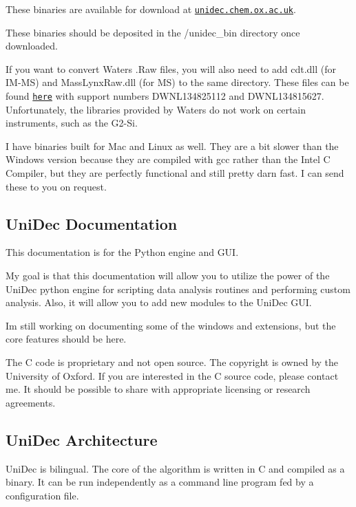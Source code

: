 These binaries are available for download at \href{http://unidec.chem.ox.ac.uk/}{\tt unidec.\+chem.\+ox.\+ac.\+uk}.

These binaries should be deposited in the /unidec\+\_\+bin directory once downloaded.

If you want to convert Waters .Raw files, you will also need to add cdt.\+dll (for I\+M-\/\+M\+S) and Mass\+Lynx\+Raw.\+dll (for M\+S) to the same directory. These files can be found \href{http://www.waters.com/waters/supportList.htm?cid=511442&locale=en_GB&filter=documenttype|DWNL&locale=en_GB}{\tt here} with support numbers D\+W\+N\+L134825112 and D\+W\+N\+L134815627. Unfortunately, the libraries provided by Waters do not work on certain instruments, such as the G2-\/\+Si.

I have binaries built for Mac and Linux as well. They are a bit slower than the Windows version because they are compiled with gcc rather than the Intel C Compiler, but they are perfectly functional and still pretty darn fast. I can send these to you on request.

\subsection*{Uni\+Dec Documentation}

This documentation is for the Python engine and G\+U\+I.

My goal is that this documentation will allow you to utilize the power of the Uni\+Dec python engine for scripting data analysis routines and performing custom analysis. Also, it will allow you to add new modules to the Uni\+Dec G\+U\+I.

I\textquotesingle{}m still working on documenting some of the windows and extensions, but the core features should be here.

The C code is proprietary and not open source. The copyright is owned by the University of Oxford. If you are interested in the C source code, please contact me. It should be possible to share with appropriate licensing or research agreements.

\subsection*{Uni\+Dec Architecture}

Uni\+Dec is bilingual. The core of the algorithm is written in C and compiled as a binary. It can be run independently as a command line program fed by a configuration file.

